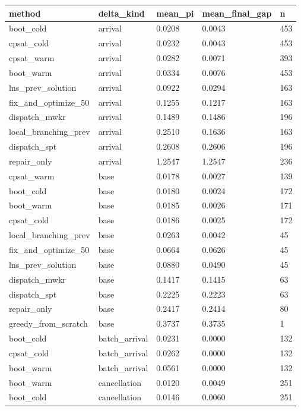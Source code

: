 \begin{table}[t]
\centering
\begin{tabular}{lllll}
\toprule
method & delta\_kind & mean\_pi & mean\_final\_gap & n \\
\midrule
boot\_cold & arrival & 0.0208 & 0.0043 & 453 \\
cpsat\_cold & arrival & 0.0232 & 0.0043 & 453 \\
cpsat\_warm & arrival & 0.0282 & 0.0071 & 393 \\
boot\_warm & arrival & 0.0334 & 0.0076 & 453 \\
lns\_prev\_solution & arrival & 0.0922 & 0.0294 & 163 \\
fix\_and\_optimize\_50 & arrival & 0.1255 & 0.1217 & 163 \\
dispatch\_mwkr & arrival & 0.1489 & 0.1486 & 196 \\
local\_branching\_prev & arrival & 0.2510 & 0.1636 & 163 \\
dispatch\_spt & arrival & 0.2608 & 0.2606 & 196 \\
repair\_only & arrival & 1.2547 & 1.2547 & 236 \\
cpsat\_warm & base & 0.0178 & 0.0027 & 139 \\
boot\_cold & base & 0.0180 & 0.0024 & 172 \\
boot\_warm & base & 0.0185 & 0.0026 & 171 \\
cpsat\_cold & base & 0.0186 & 0.0025 & 172 \\
local\_branching\_prev & base & 0.0263 & 0.0042 & 45 \\
fix\_and\_optimize\_50 & base & 0.0664 & 0.0626 & 45 \\
lns\_prev\_solution & base & 0.0880 & 0.0490 & 45 \\
dispatch\_mwkr & base & 0.1417 & 0.1415 & 63 \\
dispatch\_spt & base & 0.2225 & 0.2223 & 63 \\
repair\_only & base & 0.2417 & 0.2414 & 80 \\
greedy\_from\_scratch & base & 0.3737 & 0.3735 & 1 \\
boot\_cold & batch\_arrival & 0.0231 & 0.0000 & 132 \\
cpsat\_cold & batch\_arrival & 0.0262 & 0.0000 & 132 \\
boot\_warm & batch\_arrival & 0.0561 & 0.0000 & 132 \\
boot\_warm & cancellation & 0.0120 & 0.0049 & 251 \\
boot\_cold & cancellation & 0.0146 & 0.0060 & 251 \\

\end{tabular}
\end{table}
